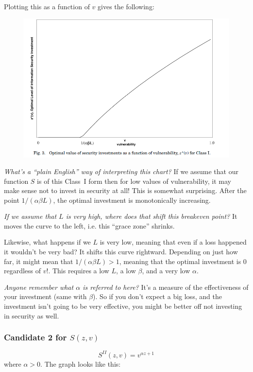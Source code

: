 \documentclass[11pt]{article}
\begin{document}
Plotting this as a function of $v$ gives the following:
\begin{figure}[h]
    \centering
    \includegraphics*[width=4.5in]{fig3.png}
    \label{fig:fig3}
\end{figure}
\FloatBarrier

{\it What's a ``plain English'' way of interpreting this chart?} If we assume that our function $S$ is of this Class~I form then for low values of vulnerability, it may make sense not to invest in security at all! This is somewhat surprising. After the point $1/(\alpha \beta L)$, the optimal investment is monotonically increasing.

{\it If we assume that $L$ is very high, where does that shift this breakeven point?} It moves the curve to the left, i.e. this ``grace zone'' shrinks.

Likewise, what happens if we $L$ is very low, meaning that even if a loss happened it wouldn't be very bad? It shifts this curve rightward. Depending on just how far, it might mean that $1/(\alpha \beta L) > 1$, meaning that the optimal investment is 0 regardless of $v$!. This requires a low $L$, a low $\beta$, and a very low $\alpha$.

{\it Anyone remember what $\alpha$ is referred to here?} It's a measure of the effectiveness of your investment (same with $\beta$). So if you don't expect a big loss, and the investment isn't going to be very effective, you might be better off not investing in security as well.


\subsubsection{Candidate 2 for $S(z,v)$}


$$S^{II}(z,v) = v^{\alpha z + 1}$$
where $\alpha > 0$. The graph looks like this:
\end{document}
